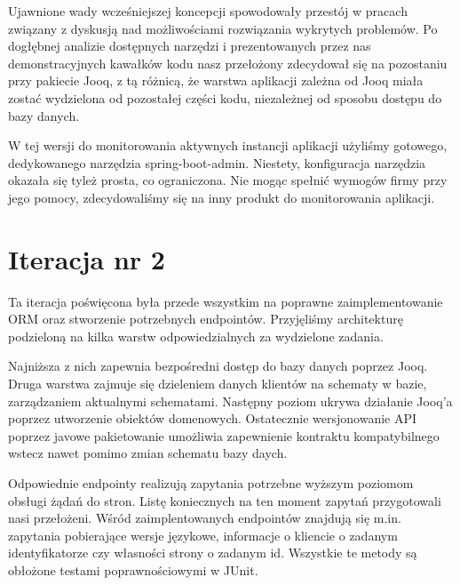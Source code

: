 \documentclass[licencjacka]{pracamgr}
\begin{document}
\vspace{1mm}

Ujawnione wady wcześniejszej koncepcji spowodowały przestój w pracach związany z dyskusją nad możliwościami rozwiązania wykrytych problemów. Po dogłębnej analizie dostępnych narzędzi i prezentowanych przez nas demonstracyjnych kawałków kodu nasz przełożony zdecydował się na pozostaniu przy pakiecie Jooq, z tą różnicą, że warstwa aplikacji zależna od Jooq miała zostać wydzielona od pozostałej części kodu, niezależnej od sposobu dostępu do bazy danych.

\vspace{1mm}

W tej wersji do monitorowania aktywnych instancji aplikacji użyliśmy gotowego, dedykowanego narzędzia spring-boot-admin. Niestety, konfiguracja narzędzia okazała się tyleż prosta, co ograniczona. Nie mogąc spełnić wymogów firmy przy jego pomocy, zdecydowaliśmy się na inny produkt do monitorowania aplikacji.
	
\section{Iteracja nr 2}

Ta iteracja poświęcona była przede wszystkim na poprawne zaimplementowanie ORM oraz stworzenie potrzebnych endpointów. Przyjęliśmy architekturę podzieloną na kilka warstw odpowiedzialnych za wydzielone zadania. 

\vspace{1mm}

Najniższa z nich zapewnia bezpośredni dostęp do bazy danych poprzez Jooq. Druga warstwa zajmuje się dzieleniem danych klientów na schematy w bazie, zarządzaniem aktualnymi schematami. Następny poziom ukrywa działanie Jooq’a poprzez utworzenie obiektów domenowych. Ostatecznie wersjonowanie API poprzez javowe pakietowanie umożliwia zapewnienie kontraktu kompatybilnego wstecz nawet pomimo zmian schematu bazy daych.

\vspace{1mm}

Odpowiednie endpointy realizują zapytania potrzebne wyższym poziomom obsługi żądań do stron. Listę koniecznych na ten moment zapytań przygotowali nasi przełożeni. Wśród zaimplentowanych endpointów znajdują się m.in. zapytania pobierające wersje językowe, informacje o kliencie o zadanym identyfikatorze czy własności strony o zadanym id. Wszystkie te metody są obłożone testami poprawnościowymi w JUnit.
\end{document}
